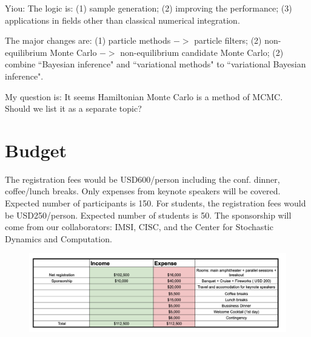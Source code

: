 \documentclass{article}
\newcommand{\ny}[1]{{\color{brown}Yiou: #1}}
\begin{document}
\ny{The logic is: (1) sample generation; (2) improving the performance; (3) applications in fields other than classical numerical integration. 

The major changes are: (1) particle methods $->$ particle filters; (2) non-equilibrium Monte Carlo $->$ non-equilibrium candidate Monte Carlo; (2) combine ``Bayesian inference" and ``variational methods" to ``variational Bayesian inference". 

My question is: It seems Hamiltonian Monte Carlo is a method of MCMC. Should we list it as a separate topic?}


\section{Budget}
The registration fees would be USD600/person including the conf. dinner, coffee/lunch breaks. Only expenses from keynote speakers will be covered. Expected number of participants is 150. For students, the registration fees would be USD250/person. Expected number of students is 50. The sponsorship will come from our collaborators: IMSI, CISC, and the Center for Stochastic Dynamics and Computation.






\begin{figure}[h]
    \centering
    \includegraphics[width =.95\textwidth]{budgetv3.png}
\end{figure}
\end{document}
